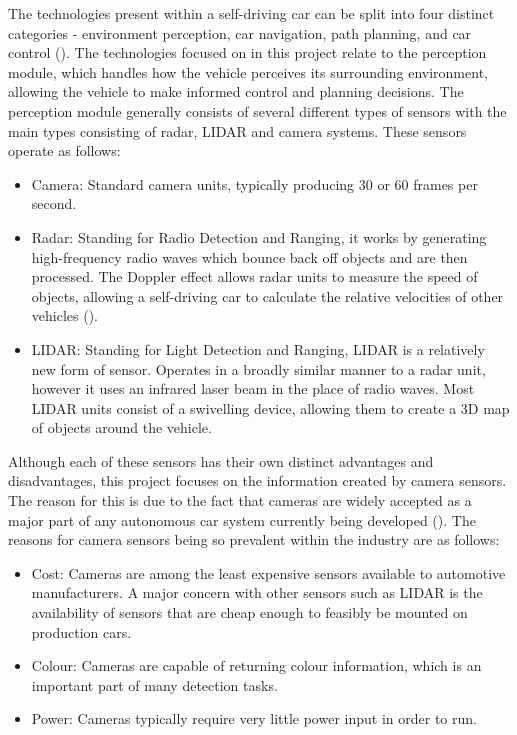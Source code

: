 \documentclass[12pt]{report}
\begin{document}
\vspace{0.5cm}
\begin{flushleft}
The technologies present within a self-driving car can be split into four distinct categories - environment perception, car navigation, path planning, and car control (\cite{zhao2018key}). The technologies focused on in this project relate to the perception module, which handles how the vehicle perceives its surrounding environment, allowing the vehicle to make informed control and planning decisions. The perception module generally consists of several different types of sensors with the main types consisting of radar, LIDAR and camera systems. These sensors operate as follows:
\begin{itemize}
\item Camera: Standard camera units, typically producing 30 or 60 frames per second.
\item Radar: Standing for Radio Detection and Ranging, it works by generating high-frequency radio waves which bounce back off objects and are then processed. The Doppler effect allows radar units to measure the speed of objects, allowing a self-driving car to calculate the relative velocities of other vehicles (\cite{kocic2018sensors}).
\item LIDAR: Standing for Light Detection and Ranging, LIDAR is a relatively new form of sensor. Operates in a broadly similar manner to a radar unit, however it uses an infrared laser beam in the place of radio waves. Most LIDAR units consist of a swivelling device, allowing them to create a 3D map of objects around the vehicle.
\end{itemize}

\vspace{0.5cm}
Although each of these sensors has their own distinct advantages and disadvantages, this project focuses on the information created by camera sensors. The reason for this is due to the fact that cameras are widely accepted as a major part of any autonomous car system currently being developed (\cite{kocic2018sensors}). The reasons for camera sensors being so prevalent within the industry are as follows:
\begin{itemize}
\item Cost: Cameras are among the least expensive sensors available to automotive manufacturers. A major concern with other sensors such as LIDAR is the availability of sensors that are cheap enough to feasibly be mounted on production cars.
\item Colour: Cameras are capable of returning colour information, which is an important part of many detection tasks.
\item Power: Cameras typically require very little power input in order to run.
\end{itemize}


\end{flushleft}
\end{document}
